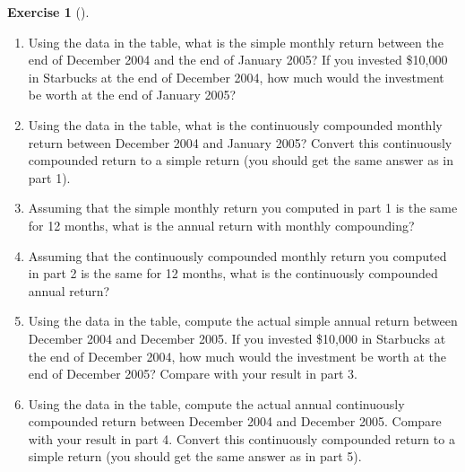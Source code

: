 \documentclass[
  letterpaper,
  DIV=11,
  numbers=noendperiod]{scrreprt}
\providecommand{\tightlist}{%
  \setlength{\itemsep}{0pt}\setlength{\parskip}{0pt}}\usepackage{longtable,booktabs,array}
\theoremstyle{definition}
\newtheorem{exercise}{Exercise}[chapter]
\theoremstyle{definition}
\theoremstyle{remark}
\begin{document}
\begin{exercise}[]
\begin{enumerate}
\def\labelenumi{\arabic{enumi}.}
\tightlist
\item
  Using the data in the table, what is the simple monthly return between
  the end of December 2004 and the end of January 2005? If you invested
  \$10,000 in Starbucks at the end of December 2004, how much would the
  investment be worth at the end of January 2005?
\item
  Using the data in the table, what is the continuously compounded
  monthly return between December 2004 and January 2005? Convert this
  continuously compounded return to a simple return (you should get the
  same answer as in part 1).
\item
  Assuming that the simple monthly return you computed in part 1 is the
  same for 12 months, what is the annual return with monthly
  compounding?
\item
  Assuming that the continuously compounded monthly return you computed
  in part 2 is the same for 12 months, what is the continuously
  compounded annual return?
\item
  Using the data in the table, compute the actual simple annual return
  between December 2004 and December 2005. If you invested \$10,000 in
  Starbucks at the end of December 2004, how much would the investment
  be worth at the end of December 2005? Compare with your result in part
  3.
\item
  Using the data in the table, compute the actual annual continuously
  compounded return between December 2004 and December 2005. Compare
  with your result in part 4. Convert this continuously compounded
  return to a simple return (you should get the same answer as in part
  5).
\end{enumerate}

\end{exercise}
\end{document}
